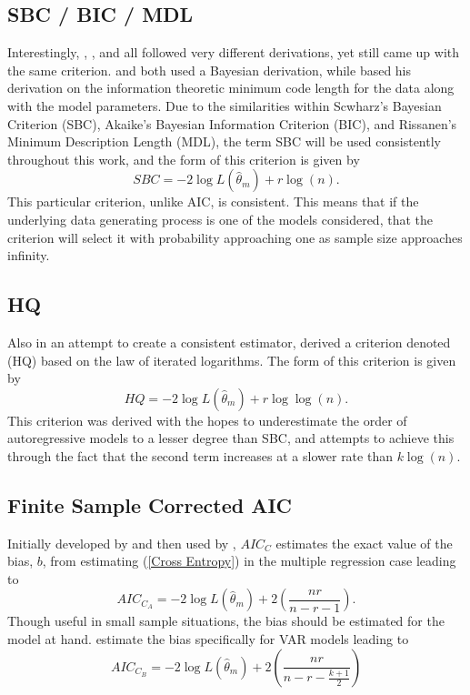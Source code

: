 \subsection{SBC / BIC / MDL}

Interestingly, \citet{Schw:1978}, \citet{Akaike:1978}, \citet{Riss:1978}
and all followed very different derivations, yet still came up with
the same criterion. \citet{Schw:1978} and \citet{Akaike:1978} both
used a Bayesian derivation, while \citet{Riss:1978} based his derivation
on the information theoretic minimum code length for the data along
with the model parameters. Due to the similarities within Scwharz's
Bayesian Criterion (SBC), Akaike's Bayesian Information Criterion
(BIC), and Rissanen's Minimum Description Length (MDL), the term SBC
will be used consistently throughout this work, and the form of this
criterion is given by
\begin{equation}
SBC=-2\log L\left(\hat{\theta}_{m}\right)+r\log\left(n\right).\label{SBC}
\end{equation}
This particular criterion, unlike AIC, is consistent. This means that
if the underlying data generating process is one of the models considered,
that the criterion will select it with probability approaching one
as sample size approaches infinity.


\subsection{HQ}

Also in an attempt to create a consistent estimator, \citet{Hann:Quin:1979}
derived a criterion denoted (HQ) based on the law of iterated logarithms.
The form of this criterion is given by
\begin{equation}
HQ=-2\log L\left(\hat{\theta}_{m}\right)+r\log\log\left(n\right).\label{HQ}
\end{equation}
This criterion was derived with the hopes to underestimate the order
of autoregressive models to a lesser degree than SBC, and attempts
to achieve this through the fact that the second term increases at
a slower rate than $k\log\left(n\right)$.


\subsection{Finite Sample Corrected AIC}

Initially developed by \citet{Sugi:1978} and then used by \citet{Hurv:Tsai:1989},
$AIC_{C}$ estimates the exact value of the bias, $b$, from estimating
(\ref{Cross Entropy}) in the multiple regression case leading to
\begin{equation}
AIC_{C_{A}}=-2\log L\left(\hat{\theta}_{m}\right)+2\left(\frac{nr}{n-r-1}\right).\label{AICc (regression)}
\end{equation}
Though useful in small sample situations, the bias should be estimated
for the model at hand. \citet{Hurv:Tsai:1993} estimate the bias specifically
for VAR models leading to
\begin{equation}
AIC_{C_{B}}=-2\log L\left(\hat{\theta}_{m}\right)+2\left(\frac{nr}{n-r-\frac{k+1}{2}}\right)\label{AICc VAR}
\end{equation}



